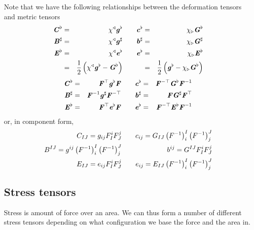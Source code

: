 Note that we have the following relationships between the deformation tensors
and metric tensors
\begin{alignat}{7}
  \boldsymbol{\mathit{C}}^{\flat}&=& \chi^{\triangleleft}\boldsymbol{\mathit{g}}^{\flat}  &\quad&
  \boldsymbol{\mathit{c}}^{\flat}&=& \chi_{\triangleright}\boldsymbol{\mathit{G}}^{\flat}  \\
   \boldsymbol{\mathit{B}}^{\sharp} &=& \chi^{\triangleleft} \boldsymbol{\mathit{g}}^{\sharp}   &\quad&
   \boldsymbol{\mathit{b}}^{\sharp} &=& \chi_{\triangleright} \boldsymbol{\mathit{G}}^{\sharp}   \\
  \boldsymbol{\mathit{E}}^{\flat}&=& \chi^{\triangleleft}\boldsymbol{\mathit{e}}^{\flat}  &\quad&
  \boldsymbol{\mathit{e}}^{\flat}&=& \chi_{\triangleright}\boldsymbol{\mathit{E}}^{\flat}  \\ 
  &=&\frac{1}{2}\left(  \chi^{\triangleleft}\boldsymbol{\mathit{g}}^{\flat} -\boldsymbol{\mathit{G}}^{\flat} \right)&\quad&
  &=&\frac{1}{2}\left( \boldsymbol{\mathit{g}}^{\flat}- \chi_{\triangleright}\boldsymbol{\mathit{G}}^{\flat}  \right)
\end{alignat}
\ie
\begin{alignat}{7}
  \boldsymbol{\mathit{C}}^{\flat}&=& {\boldsymbol{\mathit{F}}}^{ \top } \boldsymbol{\mathit{g}}^{\flat}\boldsymbol{\mathit{F}} &\quad&
  \boldsymbol{\mathit{c}}^{\flat}&=& {\boldsymbol{\mathit{F}}}^{- \top } \boldsymbol{\mathit{G}}^{\flat}{\boldsymbol{\mathit{F}}}^{-1} \\
   \boldsymbol{\mathit{B}}^{\sharp} &=&{\boldsymbol{\mathit{F}}}^{-1} \boldsymbol{\mathit{g}}^{\sharp}  {\boldsymbol{\mathit{F}}}^{- \top }  &\quad&
   \boldsymbol{\mathit{b}}^{\sharp} &=&\boldsymbol{\mathit{F}} \boldsymbol{\mathit{G}}^{\sharp}  {\boldsymbol{\mathit{F}}}^{ \top }  \\
  \boldsymbol{\mathit{E}}^{\flat}&=& {\boldsymbol{\mathit{F}}}^{ \top } \boldsymbol{\mathit{e}}^{\flat}\boldsymbol{\mathit{F}} &\quad&
  \boldsymbol{\mathit{e}}^{\flat}&=& {\boldsymbol{\mathit{F}}}^{- \top } \boldsymbol{\mathit{E}}^{\flat}{\boldsymbol{\mathit{F}}}^{-1}   
\end{alignat}
or, in component form,
\begin{alignat}{3}
  C_{IJ}=g_{ij}F^{i}_{I}F^{j}_{J} &\quad& 
  c_{ij}=G_{IJ}\left( {F}^{-1} \right)^{I}_{i}\left( {F}^{-1} \right)^{J}_{j} \\
  B^{IJ}=g^{ij}\left( {F}^{-1} \right)^{I}_{i}\left( {F}^{-1} \right)^{J}_{j} &\quad&
  b^{ij}=G^{IJ}F^{i}_{I}F^{j}_{J} \\
  E_{IJ}=e_{ij}F^{i}_{I}F^{j}_{J} &\quad&
  e_{ij}=E_{IJ}\left( {F}^{-1} \right)^{I}_{i}\left( {F}^{-1} \right)^{J}_{j}   
\end{alignat}

\subsection{Stress tensors}

Stress is amount of force over an area. We can thus form a number of different
stress tensors depending on what configuration we base the force and the area
in.


